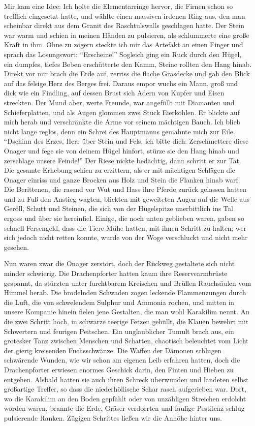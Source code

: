 Mir kam eine Idee: Ich holte die Elementarringe hervor, die Firnen schon so trefflich eingesetzt hatte, und wählte einen massiven irdenen Ring aus, den man scheinbar direkt aus dem Granit des Raschtulswalls geschlagen hatte. Der Stein war warm und schien in meinen Händen zu pulsieren, als schlummerte eine große Kraft in ihm. Ohne zu zögern steckte ich mir das Artefakt an einen Finger und sprach das Losungswort: ``Erscheine!'' Sogleich ging ein Ruck durch den Hügel, ein dumpfes, tiefes Beben erschütterte den Kamm, Steine rollten den Hang hinab. Direkt vor mir brach die Erde auf, zerriss die flache Grasdecke und gab den Blick auf das felsige Herz des Berges frei. Daraus empor wuchs ein Mann, groß und dick wie ein Findling, auf dessen Brust sich Adern von Kupfer und Eisen streckten. Der Mund aber, werte Freunde, war angefüllt mit Diamanten und Schieferplatten, und als Augen glommen zwei Stück Eierkohlen. Er blickte auf mich herab und verschränkte die Arme vor seinem mächtigen Bauch. Ich blieb nicht lange reglos, denn ein Schrei des Hauptmanns gemahnte mich zur Eile. ``Dschinn des Erzes, Herr über Stein und Fels, ich bitte dich: Zerschmettere diese Onager und fege sie von deinem Hügel hinfort, stürze sie den Hang hinab und zerschlage unsere Feinde!'' Der Riese nickte bedächtig, dann schritt er zur Tat. Die gesamte Erhebung schien zu erzittern, als er mit mächtigen Schlägen die Onager einriss und ganze Brocken aus Holz und Stein die Flanken hinab warf. Die Berittenen, die rasend vor Wut und Hass ihre Pferde zurück gelassen hatten und zu Fuß den Anstieg wagten, blickten mit geweiteten Augen auf die Welle aus Geröll, Schutt und Steinen, die sich von der Hügelspitze unerbittlich ins Tal ergoss und über sie hereinfiel. Einige, die noch unten geblieben waren, gaben so schnell Fersengeld, dass die Tiere Mühe hatten, mit ihnen Schritt zu halten; wer sich jedoch nicht retten konnte, wurde von der Woge verschluckt und nicht mehr gesehen.

Nun waren zwar die Onager zerstört, doch der Rückweg gestaltete sich nicht minder schwierig. Die Drachenpforter hatten kaum ihre Reservearmbrüste gespannt, da stürzten unter furchtbarem Kreischen und Brüllen Rauchsäulen vom Himmel herab. Die brodelnden Schwaden zogen leckende Flammenzungen durch die Luft, die von schwelendem Sulphur und Ammonia rochen, und mitten in unsere Kompanie hinein fielen jene Gestalten, die man wohl Karakilim nennt. An die zwei Schritt hoch, in schwarze teerige Fetzen gehüllt, die Klauen bewehrt mit Schwertern und feurigen Peitschen. Ein unglaublicher Tumult brach aus, ein grotesker Tanz zwischen Menschen und Schatten, chaotisch beleuchtet vom Licht der gierig kreisenden Fuchsschwänze. Die Waffen der Dämonen schlugen schwärende Wunden, wie wir schon am eigenen Leib erfahren hatten, doch die Drachenpforter erwiesen enormes Geschick darin, den Finten und Hieben zu entgehen. Alsbald hatten sie auch ihren Schreck überwunden und landeten selbst großartige Treffer, so dass die niederhöllische Schar rasch aufgerieben war. Dort, wo die Karakilim an den Boden gepfählt oder von unzähligen Streichen erdolcht worden waren, brannte die Erde, Gräser verdorrten und faulige Pestilenz schlug pulsierende Ranken. Zügigen Schrittes ließen wir die Anhöhe hinter uns.

